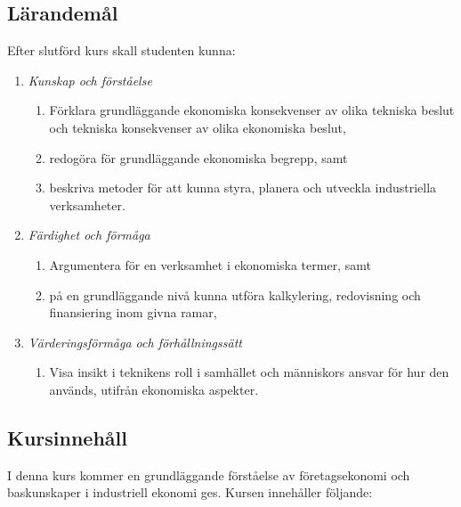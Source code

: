 \subsection*{Lärandemål}

Efter slutförd kurs skall studenten kunna:

\begin{enumerate}
\def\labelenumi{\Alph{enumi}.}
\tightlist
\item
  \emph{Kunskap och förståelse}

  \begin{enumerate}
  \def\labelenumii{\Alph{enumi}.\arabic{enumii}.}
  \tightlist
  \item
    Förklara grundläggande ekonomiska konsekvenser av olika tekniska
    beslut och tekniska konsekvenser av olika ekonomiska beslut,
  \item
    redogöra för grundläggande ekonomiska begrepp, samt
  \item
    beskriva metoder för att kunna styra, planera och utveckla
    industriella verksamheter.
  \end{enumerate}
\item
  \emph{Färdighet och förmåga}

  \begin{enumerate}
  \def\labelenumii{\Alph{enumi}.\arabic{enumii}.}
  \tightlist
  \item
    Argumentera för en verksamhet i ekonomiska termer, samt
  \item
    på en grundläggande nivå kunna utföra kalkylering, redovisning och
    finansiering inom givna ramar,
  \end{enumerate}
\item
  \emph{Värderingsförmåga och förhållningssätt}

  \begin{enumerate}
  \def\labelenumii{\Alph{enumi}.\arabic{enumii}.}
  \tightlist
  \item
    Visa insikt i teknikens roll i samhället och människors ansvar för
    hur den används, utifrån ekonomiska aspekter.
  \end{enumerate}
\end{enumerate}

\subsection*{Kursinnehåll}

I denna kurs kommer en grundläggande förståelse av företagsekonomi och
baskunskaper i industriell ekonomi ges. Kursen innehåller följande:

